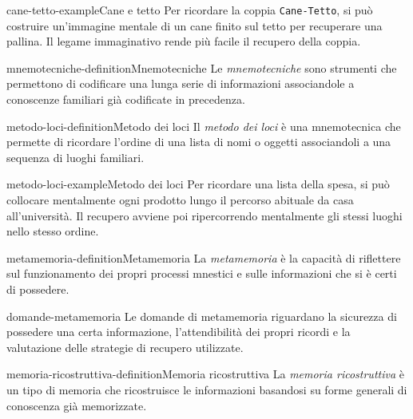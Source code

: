 \documentclass[preview]{standalone}
\begin{document}
\begin{snippetexample}{cane-tetto-example}{Cane e tetto}
    Per ricordare la coppia \texttt{Cane-Tetto}, si può costruire un'immagine
    mentale di un cane finito sul tetto per recuperare una pallina. Il legame
    immaginativo rende più facile il recupero della coppia.
\end{snippetexample}

\begin{snippetdefinition}{mnemotecniche-definition}{Mnemotecniche}
    Le \emph{mnemotecniche} sono strumenti che permettono di codificare una
    lunga serie di informazioni associandole a conoscenze familiari già
    codificate in precedenza.
\end{snippetdefinition}

\begin{snippetdefinition}{metodo-loci-definition}{Metodo dei loci}
    Il \emph{metodo dei loci} è una mnemotecnica che permette di ricordare
    l'ordine di una lista di nomi o oggetti associandoli a una sequenza di
    luoghi familiari.
\end{snippetdefinition}

\begin{snippetexample}{metodo-loci-example}{Metodo dei loci}
    Per ricordare una lista della spesa, si può collocare mentalmente ogni
    prodotto lungo il percorso abituale da casa all'università. Il recupero
    avviene poi ripercorrendo mentalmente gli stessi luoghi nello stesso ordine.
\end{snippetexample}

\begin{snippetdefinition}{metamemoria-definition}{Metamemoria}
    La \emph{metamemoria} è la capacità di riflettere sul funzionamento dei
    propri processi mnestici e sulle informazioni che si è certi di possedere.
\end{snippetdefinition}

\begin{snippet}{domande-metamemoria}
    Le domande di metamemoria riguardano la sicurezza di possedere una certa
    informazione, l'attendibilità dei propri ricordi e la valutazione delle
    strategie di recupero utilizzate.
\end{snippet}

\begin{snippetdefinition}{memoria-ricostruttiva-definition}{Memoria ricostruttiva}
    La \emph{memoria ricostruttiva} è un tipo di memoria che ricostruisce le
    informazioni basandosi su forme generali di conoscenza già memorizzate.
\end{snippetdefinition}
\end{document}
